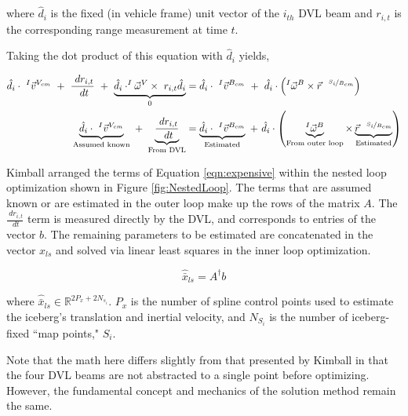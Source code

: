 where $\hat{d}_{i} $ is the fixed (in vehicle frame) unit vector of the $i_{th}$ DVL beam and $r_{i,t} $ is the corresponding range measurement at time $t$.  

Taking the dot product of this equation with $\hat{d}_{i} $ yields,

    \begin{align}
    \hat{d}_{i} \cdot~^{I}\vec{v}^{V_{cm}} ~+~ \frac{~dr_{i,t}}{~dt}  ~+~ \underbrace{\hat{d}_{i} \cdot^{I}\vec{\omega}^{V}\times{~r_{i,t}\hat{d}_{i}}}_{0}  &=
     \label{eqn:expensive}
    \hat{d}_{i} \cdot~^{I}\vec{v}^{B_{cm}} ~ + ~\hat{d}_{i} \cdot\left(^{I}\vec{\omega}^{B}\times\vec{r}^{~~\nicefrac{S_i}{B_{cm}}}\right)  \\
    \underbrace{\hat{d}_{i} \cdot~^{I}\vec{v}^{V_{cm}}}_{\text{Assumed known}} ~+~ \underbrace{\frac{~dr_{i,t}}{~dt} }_{\text{From DVL}}  &=
    \underbrace{\hat{d}_{i} \cdot~^{I}\vec{v}^{B_{cm}}}_{\text{Estimated}} ~ + ~\hat{d}_{i} \cdot\left(\underbrace{^{I}\vec{\omega}^{B}}_{\text{From outer loop}}\times\underbrace{\vec{r}^{~~\nicefrac{S_i}{B_{cm}}}}_{\text{Estimated}}\right)  
         \label{eqn:expensive2}
\end{align}

Kimball arranged the terms of Equation \ref{eqn:expensive} within the nested loop optimization shown in Figure \ref{fig:NestedLoop}. The terms that are assumed known or are estimated in the outer loop make up the rows of the matrix $A$. The $\frac{~dr_{i,t}}{~dt}$ term is measured directly by the DVL, and corresponds to entries of the vector $b$. The remaining parameters to be estimated are concatenated in the vector $x_{ls}$ and solved via linear least squares in the inner loop optimization. 

\begin{equation}
    \hat{\bar{x}}_{ls} = A^{\dagger} b
    \label{eqn:LeastSquares}
\end{equation}

where $\hat{\bar{x}}_{ls}  \in \mathbb{R}^{ 2P_x + 2N_{s_i}}$. $P_x$ is the number of spline control points used to estimate the iceberg's translation and inertial velocity, and $N_{S_i}$ is the number of iceberg-fixed ``map points," $S_i$.


Note that the math here differs slightly from that presented by Kimball in that the four DVL beams are not abstracted to a single point before optimizing. However, the fundamental concept and mechanics of the solution method remain the same.



